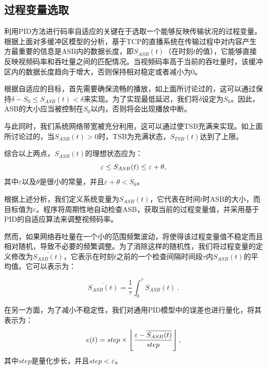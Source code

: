 \subsection{过程变量选取}

利用PID方法进行码率自适应的关键在于选取一个能够反映传输状况的过程变量。根据上面对多缓冲区模型的分析，基于TCP的直播系统在传输过程中对内容产生方最重要的信息是ASB内的数据长度，即$S_{ASB}(t)$（在时刻$t$的值），它能够直接反映视频码率和吞吐量之间的匹配情况。当视频码率高于当前的吞吐量时，该缓冲区内的数据长度趋向于增大，否则保持相对稳定或者减小为0。

根据自适应的目标，首先需要确保流畅的播放，如上面所讨论过的，这可以通过保持$\delta - S_0 \le S_{ASB}(t) < \delta$来实现。为了实现最低延迟，我们将$\delta$设定为$S_0$。因此，ASB的大小应当被控制在$S_0$以内，否则将会出现播放中断。

与此同时，我们系统网络带宽被充分利用，这可以通过使TSB充满来实现。如上面所讨论过的，当$S_{ASB}(t)>0$时，TSB为充满状态，$S_{TSB}(t)$达到了上限。

综合以上两点，$S_{ASB}(t)$的理想状态应为：
\begin{equation}
\vspace{10pt}
\varepsilon \le S_{ASB}(t) \le \varepsilon+\theta,
\end{equation}
其中$\varepsilon$以及$\theta$是很小的常量，并且$\varepsilon+\theta<S_0$。

根据上述分析，我们定义系统变量为$S_{ASB}(t)$，它代表在时间$t$时ASB的大小，而目标值为$\varepsilon$。程序将周期性地自动检查ASB，获取当前的过程变量值，并采用基于PID的自适应算法来调整视频码率。

然而，如果网络吞吐量在一个小的范围频繁波动，将使得该过程变量值不稳定而且相对随机，导致不必要的频繁调整。为了消除这样的随机性，我们将过程变量的定义修改为$\overline{S_{ASB}(t)}$，它表示在时刻$t$之前的一个检查间隔时间段$\tau$内$S_{ASB}(t)$的平均值。它可以表示为：

\begin{equation}
\label{eq:asb}
\overline{S_{ASB}(t)} = \dfrac{1}{\tau} \int_0^\tau {S_{ASB}(t)}\: .
\end{equation}

\vspace{10pt}
在另一方面，为了减小不稳定性，我们对通用PID模型中的误差也进行量化，将其表示为：
\begin{equation}
\vspace{10pt}
e(t) = step \times \left \lfloor\dfrac{\varepsilon - \overline{S_{ASB}(t)}}{step} \right \rfloor,
\end{equation}
其中$step$是量化步长，并且$step<\varepsilon$。

